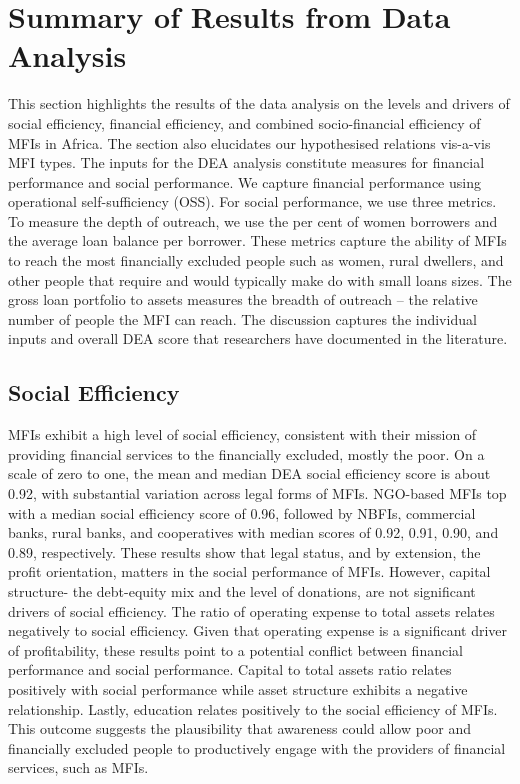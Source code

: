 \documentclass[
]{article}
\begin{document}
\hypertarget{summary-of-results-from-data-analysis}{%
\section{Summary of Results from Data
Analysis}\label{summary-of-results-from-data-analysis}}

This section highlights the results of the data analysis on the levels
and drivers of social efficiency, financial efficiency, and combined
socio-financial efficiency of MFIs in Africa. The section also
elucidates our hypothesised relations vis-a-vis MFI types. The inputs
for the DEA analysis constitute measures for financial performance and
social performance. We capture financial performance using operational
self-sufficiency (OSS). For social performance, we use three metrics. To
measure the depth of outreach, we use the per cent of women borrowers
and the average loan balance per borrower. These metrics capture the
ability of MFIs to reach the most financially excluded people such as
women, rural dwellers, and other people that require and would typically
make do with small loans sizes. The gross loan portfolio to assets
measures the breadth of outreach -- the relative number of people the
MFI can reach. The discussion captures the individual inputs and overall
DEA score that researchers have documented in the literature.

\hypertarget{social-efficiency}{%
\subsection{Social Efficiency}\label{social-efficiency}}

MFIs exhibit a high level of social efficiency, consistent with their
mission of providing financial services to the financially excluded,
mostly the poor. On a scale of zero to one, the mean and median DEA
social efficiency score is about 0.92, with substantial variation across
legal forms of MFIs. NGO-based MFIs top with a median social efficiency
score of 0.96, followed by NBFIs, commercial banks, rural banks, and
cooperatives with median scores of 0.92, 0.91, 0.90, and 0.89,
respectively. These results show that legal status, and by extension,
the profit orientation, matters in the social performance of MFIs.
However, capital structure- the debt-equity mix and the level of
donations, are not significant drivers of social efficiency. The ratio
of operating expense to total assets relates negatively to social
efficiency. Given that operating expense is a significant driver of
profitability, these results point to a potential conflict between
financial performance and social performance. Capital to total assets
ratio relates positively with social performance while asset structure
exhibits a negative relationship. Lastly, education relates positively
to the social efficiency of MFIs. This outcome suggests the plausibility
that awareness could allow poor and financially excluded people to
productively engage with the providers of financial services, such as
MFIs.
\end{document}
